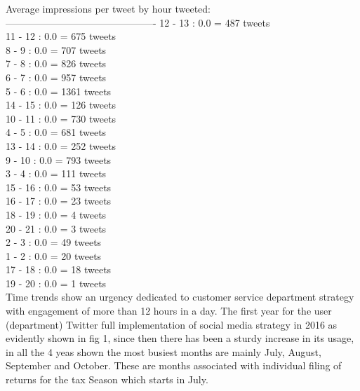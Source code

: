 Average impressions per tweet by hour tweeted:
----------------------------------------------
12 - 13 : 0.0 = 487 tweets\\
11 - 12 : 0.0 = 675 tweets\\
 8 - 9  : 0.0 = 707 tweets\\
 7 - 8  : 0.0 = 826 tweets\\
 6 - 7  : 0.0 = 957 tweets\\
 5 - 6  : 0.0 = 1361 tweets\\
14 - 15 : 0.0 = 126 tweets\\
10 - 11 : 0.0 = 730 tweets\\
 4 - 5  : 0.0 = 681 tweets\\
13 - 14 : 0.0 = 252 tweets\\
 9 - 10 : 0.0 = 793 tweets\\
 3 - 4  : 0.0 = 111 tweets\\
15 - 16 : 0.0 = 53 tweets\\
16 - 17 : 0.0 = 23 tweets\\
18 - 19 : 0.0 = 4  tweets\\
20 - 21 : 0.0 = 3  tweets\\
 2 - 3  : 0.0 = 49 tweets\\
 1 - 2  : 0.0 = 20 tweets\\
17 - 18 : 0.0 = 18 tweets\\
19 - 20 : 0.0 = 1  tweets\\

Time trends show an urgency dedicated to customer service department strategy with engagement of more than 12 hours in a day.   The first year for the user (department) Twitter full implementation of social media strategy in 2016 as evidently shown in fig 1, since then  there has been a sturdy increase in its usage, in all the 4 yeas shown the most busiest months are mainly July, August, September and October.  These are months associated with individual filing of returns for the tax Season which starts in July.\\

